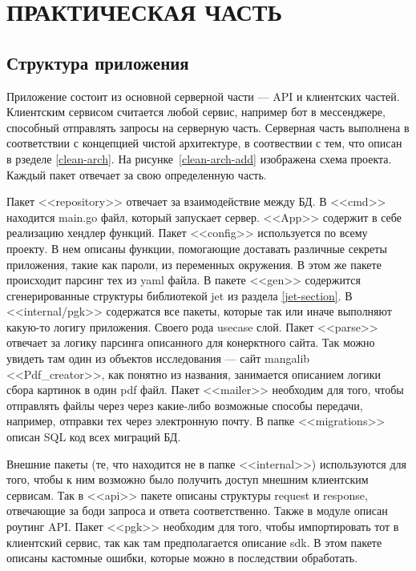 \section{ПРАКТИЧЕСКАЯ ЧАСТЬ}

\subsection{Структура приложения}
Приложение состоит из основной серверной части --- API и клиентских частей. 
Клиентским сервисом считается любой сервис, например бот в мессенджере, способный отправлять запросы на серверную часть.
Серверная часть выполнена в соответствии с концепцией чистой архитектуре, в соотвествии с тем, что описан в рзеделе \ref{clean-arch}.
На рисунке~\ref{clean-arch-add} изображена схема проекта.
Каждый пакет отвечает за свою определенную часть.

Пакет <<repository>> отвечает за взаимодействие между БД. В <<cmd>> находится main.go файл, который запускает сервер.
<<App>> содержит в себе реализацию хендлер функций. Пакет <<config>> используется по всему проекту. 
В нем описаны функции, помогающие доставать различные секреты приложения, такие как пароли, из переменных окружения.
В этом же пакете происходит парсинг тех из yaml файла.
В пакете <<gen>> содержится сгенерированные структуры библиотекой jet из раздела \ref{jet-section}. 
В <<internal/pgk>> содержатся все пакеты, которые так или иначе выполняют какую-то логигу приложения.
Своего рода usecase слой.
Пакет <<parse>> отвечает за логику парсинга описанного для конерктного сайта. Так можно увидеть там один из объектов исследования --- сайт mangalib
<<Pdf\_creator>>, как понятно из названия, занимается описанием логики сбора картинок в один pdf файл.
Пакет <<mailer>> необходим для того, чтобы отправлять файлы через через какие-либо возможные способы передачи, например, отправки тех через электронную почту.
В папке <<migrations>> описан SQL код всех миграций БД.

Внешние пакеты (те, что находится не в папке <<internal>>) используются для того, чтобы к ним возможно было получить доступ мнешним клиентским сервисам.
Так в <<api>> пакете описаны структуры request и response, отвечающие за боди запроса и ответа соответственно.
Также в модуле описан роутинг API. 
Пакет <<pgk>> необходим для того, чтобы импортировать тот в клиентский сервис, так как там предполагается описание sdk.
В этом пакете описаны кастомные ошибки, которые можно в последствии обработать.